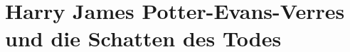 \part{Harry James Potter-Evans-Verres und die Schatten des Todes}

% 
% 
% 
% 
% 
% 
% 
% 
% 
% 
% 
% 
% 
% 
% 
% 
% 
% 
% 
% 
% 
% 
% 
% 
% 
% 
% 
% 
% 
% 
% 
% 
% 
% 
% 
% 
% 
% 
% 
% 
% 
% 
% 
% 
% 
